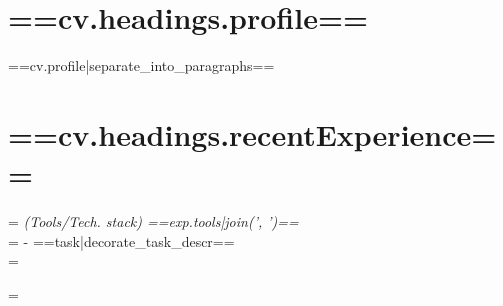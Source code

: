 \documentclass[]{CV-JuanCamiloFlorez}
\begin{document}
\begin{minipage}[t]{0.66\textwidth} 


\section{==cv.headings.profile==}
==cv.profile|separate_into_paragraphs==

\sectionsep

\section{==cv.headings.recentExperience==}
=%
    \noindent
    \textit{(Tools/Tech. stack) ==exp.tools|join(', ')==} \\
    =%
    - ==task|decorate_task_descr== \\
    =%
    \sectionsep

=%
\vspace{\topsep} %





\end{minipage}
\end{document}

